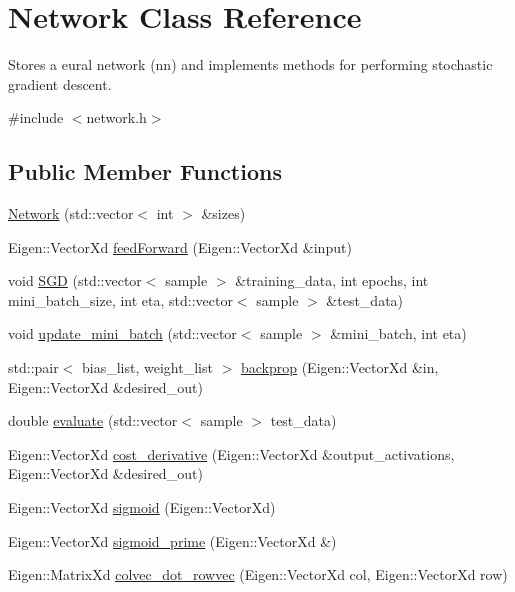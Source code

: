 \hypertarget{classNetwork}{}\section{Network Class Reference}
\label{classNetwork}


Stores a eural network (nn) and implements methods for performing stochastic gradient descent.  




{\ttfamily \#include $<$network.\+h$>$}

\subsection*{Public Member Functions}
\begin{DoxyCompactItemize}
\item 
\hyperlink{classNetwork_aa6382995a4a0bc915d12d794eb584adf}{Network} (std\+::vector$<$ int $>$ \&sizes)
\item 
Eigen\+::\+Vector\+Xd \hyperlink{classNetwork_a4fba84f6e70a7c89fff90091efd51679}{feed\+Forward} (Eigen\+::\+Vector\+Xd \&input)
\item 
void \hyperlink{classNetwork_acdb38726769a9f571f09a5f10f6b6847}{S\+GD} (std\+::vector$<$ sample $>$ \&training\+\_\+data, int epochs, int mini\+\_\+batch\+\_\+size, int eta, std\+::vector$<$ sample $>$ \&test\+\_\+data)
\item 
void \hyperlink{classNetwork_af736bbf264f09be714d5961ef670a5cb}{update\+\_\+mini\+\_\+batch} (std\+::vector$<$ sample $>$ \&mini\+\_\+batch, int eta)
\item 
std\+::pair$<$ bias\+\_\+list, weight\+\_\+list $>$ \hyperlink{classNetwork_a657a8db0aad5e948118f188b19d8584c}{backprop} (Eigen\+::\+Vector\+Xd \&in, Eigen\+::\+Vector\+Xd \&desired\+\_\+out)
\item 
double \hyperlink{classNetwork_a062ac4352c92fc2bd88b51bbc29c25a4}{evaluate} (std\+::vector$<$ sample $>$ test\+\_\+data)
\item 
Eigen\+::\+Vector\+Xd \hyperlink{classNetwork_a108865a0ac7351810451cf9ee60b57ed}{cost\+\_\+derivative} (Eigen\+::\+Vector\+Xd \&output\+\_\+activations, Eigen\+::\+Vector\+Xd \&desired\+\_\+out)
\item 
Eigen\+::\+Vector\+Xd \hyperlink{classNetwork_a1d50530a35db77496d47d5662154830a}{sigmoid} (Eigen\+::\+Vector\+Xd)
\item 
Eigen\+::\+Vector\+Xd \hyperlink{classNetwork_a8569e18257ede199f14febf93e44968f}{sigmoid\+\_\+prime} (Eigen\+::\+Vector\+Xd \&)
\item 
Eigen\+::\+Matrix\+Xd \hyperlink{classNetwork_a97f385db3fd78d16a73a7f8b2d18f968}{colvec\+\_\+dot\+\_\+rowvec} (Eigen\+::\+Vector\+Xd col, Eigen\+::\+Vector\+Xd row)
\end{DoxyCompactItemize}



